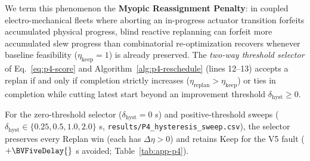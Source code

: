 We term this phenomenon the \textbf{Myopic Reassignment Penalty}: in coupled electro-mechanical fleets where aborting an in-progress actuator transition forfeits accumulated physical progress, blind reactive replanning can forfeit more accumulated slew progress than combinatorial re-optimization recovers whenever baseline feasibility ($\eta_{\mathrm{keep}}=1$) is already preserved. The \emph{two-way threshold selector} of Eq.~\eqref{eq:p4-score} and Algorithm~\ref{alg:p4-reschedule} (lines 12--13) accepts a replan if and only if completion strictly increases ($\eta_{\mathrm{replan}}>\eta_{\mathrm{keep}}$) or ties in completion while cutting latest start beyond an improvement threshold $\delta_{\mathrm{hyst}}\ge 0$.

For the zero-threshold selector ($\delta_{\mathrm{hyst}}=0$ s) and positive-threshold sweeps ($\delta_{\mathrm{hyst}}\in\{0.25,0.5,1.0,2.0\}$ s, \texttt{results/P4\_hysteresis\_sweep.csv}), the selector preserves every Replan win (each has $\Delta\eta>0$) and retains Keep for the V5 fault ($+\BVFiveDelay{}$ s avoided; Table~\ref{tab:app-p4}).
